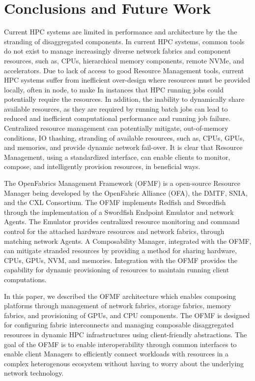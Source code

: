 \section{Conclusions and Future Work}
Current HPC systems are limited in performance and architecture by the the stranding of disaggregated components. In current HPC systems, common tools do not exist to manage increasingly diverse network fabrics and component resources, such as, CPUs, hierarchical memory components, remote NVMe, and accelerators.  Due to lack of access to good Resource Management tools, current HPC systems suffer from inefficient over-design where resources must be provided locally, often in node, to make In instances that HPC running jobs could potentially require the resources.  In addition, the inability to dynamically share available resources, as they are required by running batch jobs can lead to reduced and inefficient computational performance and running job failure.  Centralized resource management can potentially mitigate, out-of-memory conditions, IO thashing, stranding of available resources, such as, CPUs, GPUs, and memories, and provide dynamic network fail-over.  It is clear that Resource Management, using a standardized interface, can enable clients to monitor, compose, and intelligently provision resources, in beneficial ways.

The OpenFabrics Management Framework (OFMF) is a open-source Resource Manager being developed by the OpenFabric Alliance (OFA), the DMTF, SNIA, and the CXL Consortium. The OFMF implements Redfish and Swordfish through the implementation of a Swordfish Endpoint Emulator and network Agents.  The Emulator provides centralized resource monitoring and command control for the attached hardware resources and network fabrics, through matching network Agents. A Composability Manager, integrated with the OFMF, can mitigate stranded resources by providing a method for sharing hardware, CPUs, GPUs, NVM, and memories.  Integration with the OFMF provides the capability for dynamic provisioning of resources to maintain running client computations.  

In this paper, we described the OFMF architecture which enables composing platforms through management of network fabrics, storage fabrics, memory fabrics, and provisioning of GPUs, and CPU components.  The OFMF is designed for configuring fabric interconnects and managing composable disaggregated resources in dynamic HPC infrastructures using client-friendly abstractions.  The goal of the OFMF is to enable interoperability through common interfaces to enable client Managers to efficiently connect workloads with resources in a complex heterogenous ecosystem without having to worry about the underlying network technology.  


